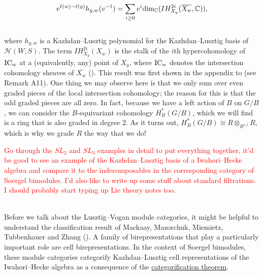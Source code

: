 \begin{remark}
\begin{align*}
\begin{split}
v^{\ell(w) - \ell(y)} h_{y,w}(v^{-1}) = \sum_{i \geq 0} v^i \textup{dim}_\mathbb{C}(IH^{2i}_{X_y}(\overline{X_w}, \mathbb{C})),
\end{split}
\end{align*}
\noindent\\[-0.7\linespacing] where $h_{y,w}$ is a Kazhdan--Lusztig polynomial for the Kazhdan--Lusztig basis of $\mathscr{H}(W, S)$. The term $IH^{2i}_{X_y}(X_w)$ is the stalk of the $i$th hypercohomology of $\textup{IC}_w$ at a (equivalently, any) point of $X_y$, where $\textup{IC}_w$ denotes the intersection cohomology sheaves of $\overline{X_w}$ (\cite[Theorem 13.13]{EMTW20}). This result was first shown in the appendix to \cite{KL79} (see Remark A11). One thing we may observe here is that we only sum over even graded pieces of the local intersection cohomology; the reason for this is that the odd graded pieces are all zero. In fact, because we have a left action of $B$ on $G/B$, we can consider the $B$-equivariant cohomology $H_B^*(G/B)$, which we will find is a ring that is also graded in degree $2$. As it turns out, $H_B^*(G/B) \cong R \otimes_{R^{s,t}} R$, which is why we grade $R$ the way that we do!\newpage
\end{remark}

\noindent\textcolor{red}{Go through the $SL_2$ and $SL_3$ examples in detail to put everything together, it'd be good to see an example of the Kazhdan--Lusztig basis of a Iwahori--Hecke algebra and compare it to the indecomposables in the corresponding category of Soergel bimodules. I'd also like to write up some stuff about standard filtrations. I should probably start typing up Lie theory notes too.}\\
\newpage

\noindent 

\newpage

\noindent\\ Before we talk about the Lusztig--Vogan module categories, it might be helpful to understand the classification result of Mackaay, Mazorchuk, Miemietz, Tubbenhauer and Zhang (\cite{MMMTZ23}). A family of birepresentations that play a particularly important role are cell birepresentations. In the context of Soergel bimodules, these module categories categorify Kazhdan--Lusztig cell representations of the Iwahori--Hecke algebra as a consequence of the \hyperref[SoergelConjecture]{categorification theorem}.\\


